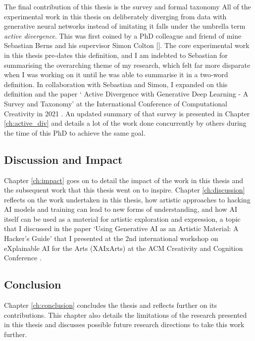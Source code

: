 The final contribution of this thesis is the survey and formal taxonomy All of the experimental work in this thesis on deliberately diverging from data with generative neural networks instead of imitating it falls under the umbrella term \textit{active divergence}. 
This was first coined by a PhD colleague and friend of mine Sebastian Berns and his supervisor Simon Colton [\citeyear{berns2020bridging}]. 
The core experimental work in this thesis pre-dates this definition, and I am indebted to Sebastian for summarising the overarching theme of my research, which felt far more disparate when I was working on it until he was able to summarise it in a two-word definition. 
In collaboration with Sebastian and Simon, I expanded on this definition and the paper ` Active Divergence with Generative Deep Learning - A Survey and Taxonomy' at the International Conference of Computational Creativity in 2021 \citep{broad2021active}.
An updated summary of that survey is presented in Chapter \ref{ch:active_div} and details a lot of the work done concurrently by others during the time of this PhD to achieve the same goal. 

\subsection{Discussion and Impact}

Chapter \ref{ch:impact} goes on to detail the impact of the work in this thesis and the subsequent work that this thesis went on to inspire. Chapter \ref{ch:discussion} reflects on the work undertaken in this thesis, how artistic approaches to hacking AI models and training can lead to new forms of understanding, and how AI itself can be used as a material for artistic exploration and expression, a topic that I discussed in the paper `Using Generative AI as an Artistic Material: A Hacker's Guide' that I presented at the 2nd international workshop on eXplainable AI for the Arts (XAIxArts) at the ACM Creativity and Cognition Conference \citep{broad2024using}.

\subsection{Conclusion}

Chapter \ref{ch:conclusion} concludes the thesis and reflects further on its contributions.
This chapter also details the limitations of the research presented in this thesis and discusses possible future research directions to take this work further.

